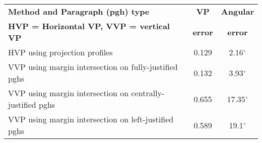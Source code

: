 
\begin{table}[t]
  \begin{center}
    \begin{tabular}{|p{95mm}|c|c|}
      \hline
      {\bf Method and Paragraph (pgh) type } & {\bf VP} & {\bf Angular} \\
      {\bf {\small HVP = Horizontal VP, VVP = vertical VP} } & {\bf error} & {\bf error} \\  \hline \hline
      HVP using projection profiles & 0.129 & 2.16$^\circ$ \\  \hline \hline
      VVP using margin intersection on fully-justified pghs & 0.132 & 3.93$^\circ$ \\ \hline
      VVP using margin intersection on centrally-justified pghs & 0.655 & 17.35$^\circ$ \\ \hline  
      VVP using margin intersection on left-justified pghs & 0.589 & 19.1$^\circ$ \\   \hline \hline
 

\end{tabular}
\end{center}
\end{table}
